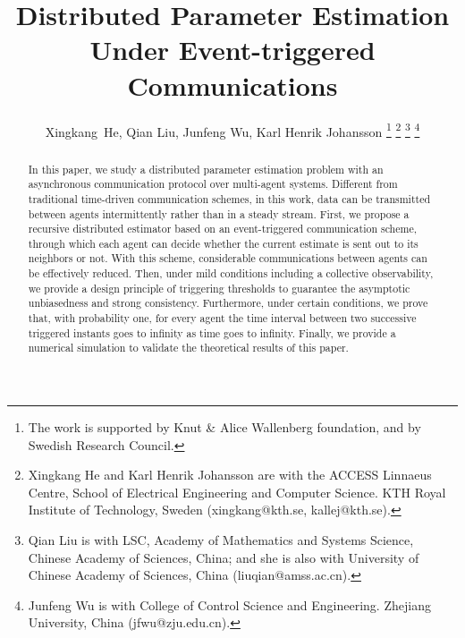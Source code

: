 \documentclass[10pt,journal,final]{IEEEtran}
\theoremstyle{plain}
\theoremstyle{definition}
\theoremstyle{remark}
\begin{document}
\title{ Distributed Parameter   Estimation Under Event-triggered Communications}

\author{Xingkang~He, Qian Liu, Junfeng Wu, 	Karl Henrik Johansson
\thanks{The work is supported by Knut \& Alice Wallenberg foundation, and by Swedish Research Council.}
\thanks{Xingkang He and Karl Henrik Johansson are with the ACCESS Linnaeus Centre, School of Electrical Engineering and Computer Science. KTH Royal Institute of Technology, Sweden (xingkang@kth.se, kallej@kth.se).}
\thanks{ Qian Liu is with LSC, Academy of Mathematics and Systems Science, Chinese Academy of Sciences, China; and she is also with University of Chinese Academy of Sciences, China (liuqian@amss.ac.cn).}
\thanks{Junfeng Wu is with  College of Control Science and Engineering. Zhejiang University, China (jfwu@zju.edu.cn).}
}


\maketitle


\begin{abstract}
In this paper, we study a distributed parameter estimation problem with an asynchronous communication protocol over multi-agent systems.
Different from   traditional time-driven communication schemes,  in this work, data can be transmitted between agents intermittently 
  rather than in a steady stream. 
First, we propose a recursive distributed estimator based on an event-triggered communication scheme, through which each agent can decide whether the current estimate is sent out to its neighbors or not. With this scheme, considerable communications between agents can be effectively reduced.
Then, under mild conditions including a collective observability, we provide a design principle of triggering thresholds to guarantee the asymptotic  unbiasedness and strong consistency.  Furthermore, under certain conditions, we prove that, with probability one, for every agent the time interval between two successive triggered instants goes to infinity as time goes to infinity. Finally, we provide a numerical simulation to validate the theoretical results of this paper.
\end{abstract}
\end{document}
